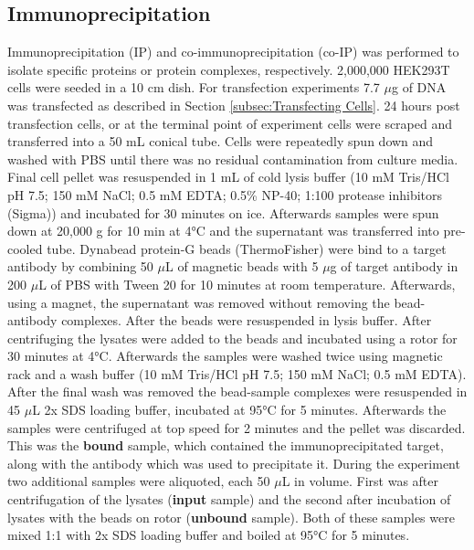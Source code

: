 \subsection{Immunoprecipitation} \label{subsec:Immunoprecipitation}
Immunoprecipitation (IP) and co-immunoprecipitation (co-IP) was performed to isolate specific proteins or protein complexes, respectively. 2,000,000 HEK293T cells were seeded in a 10 cm dish. For transfection experiments 7.7 \(\mu\)g of DNA was transfected as described in Section \ref{subsec:Transfecting Cells}. 24 hours post transfection cells, or at the terminal point of experiment cells were scraped and transferred into a 50 mL conical tube. Cells were repeatedly spun down and washed with PBS until there was no residual contamination from culture media. Final cell pellet was resuspended in 1 mL of cold lysis buffer (10 mM Tris/HCl pH 7.5; 150 mM NaCl; 0.5 mM EDTA; 0.5\% NP-40; 1:100 protease inhibitors (Sigma)) and incubated for 30 minutes on ice. Afterwards samples were spun down at 20,000 g for 10 min at 4°C and the supernatant was transferred into pre-cooled tube. Dynabead protein-G beads (ThermoFisher) were bind to a target antibody by combining 50 \(\mu\)L of magnetic beads with 5 \(\mu\)g of target antibody in 200 \(\mu\)L of PBS with Tween 20 for 10 minutes at room temperature. Afterwards, using a magnet, the supernatant was removed without removing the bead-antibody complexes. After the beads were resuspended in lysis buffer. After centrifuging the lysates were added to the beads and incubated using a rotor for 30 minutes at 4°C. Afterwards the samples were washed twice using magnetic rack and a wash buffer (10 mM Tris/HCl pH 7.5; 150 mM NaCl; 0.5 mM EDTA). After the final wash was removed the bead-sample complexes were resuspended in 45 \(\mu\)L 2x SDS loading buffer, incubated at 95°C for 5 minutes. Afterwards the samples were centrifuged at top speed for 2 minutes and the pellet was discarded. This was the \textbf{bound} sample, which contained the immunoprecipitated target, along with the antibody which was used to precipitate it. During the experiment two additional samples were aliquoted, each 50 \(\mu\)L in volume. First was after centrifugation of the lysates (\textbf{input} sample) and the second after incubation of lysates with the beads on rotor (\textbf{unbound} sample). Both of these samples were mixed 1:1 with 2x SDS loading buffer and boiled at 95°C for 5 minutes.




